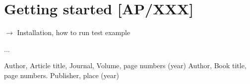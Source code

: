 \appendix
\label{}

\section{Getting started  {\bf [AP/XXX]}}
\label{code_init}

$\to$ Installation, how to run test example

\medskip
...



\begin{thebibliography}{}
%
%
Author, Article title, Journal, Volume, page numbers (year)
Author, Book title, page numbers. Publisher, place (year)
\end{thebibliography}



